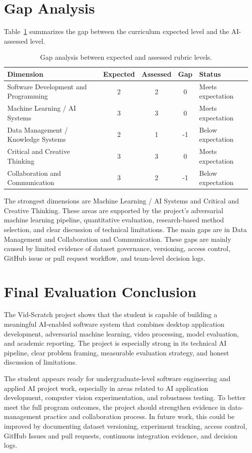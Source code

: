 \section{Gap Analysis}
\label{section:gap-analysis}

Table~\ref{tab:gap-analysis} summarizes the gap between the curriculum
expected level and the AI-assessed level.

\begin{table}[H]
\centering
\caption{Gap analysis between expected and assessed rubric levels.}
\label{tab:gap-analysis}
\renewcommand{\arraystretch}{1.3}
\begin{tabularx}{\textwidth}{|X|c|c|c|X|}
\hline
\textbf{Dimension} & \textbf{Expected} & \textbf{Assessed} & \textbf{Gap} & \textbf{Status} \\
\hline
Software Development and Programming & 2 & 2 & 0 & Meets expectation \\
\hline
Machine Learning / AI Systems & 3 & 3 & 0 & Meets expectation \\
\hline
Data Management / Knowledge Systems & 2 & 1 & -1 & Below expectation \\
\hline
Critical and Creative Thinking & 3 & 3 & 0 & Meets expectation \\
\hline
Collaboration and Communication & 3 & 2 & -1 & Below expectation \\
\hline
\end{tabularx}
\end{table}

The strongest dimensions are Machine Learning / AI Systems and
Critical and Creative Thinking. These areas are supported by the
project's adversarial machine learning pipeline, quantitative
evaluation, research-based method selection, and clear discussion of
technical limitations. The main gaps are in Data Management and
Collaboration and Communication. These gaps are mainly caused by
limited evidence of dataset governance, versioning, access control,
GitHub issue or pull request workflow, and team-level decision logs.

\section{Final Evaluation Conclusion}
\label{section:evaluation-conclusion}

The Vid-Scratch project shows that the student is capable of building
a meaningful AI-enabled software system that combines desktop
application development, adversarial machine learning, video
processing, model evaluation, and academic reporting. The project is
especially strong in its technical AI pipeline, clear problem framing,
measurable evaluation strategy, and honest discussion of limitations.

The student appears ready for undergraduate-level software engineering
and applied AI project work, especially in areas related to AI
application development, computer vision experimentation, and
robustness testing. To better meet the full program outcomes, the
project should strengthen evidence in data-management practice and
collaboration process. In future work, this could be improved by
documenting dataset versioning, experiment tracking, access control,
GitHub Issues and pull requests, continuous integration evidence, and
decision logs.
